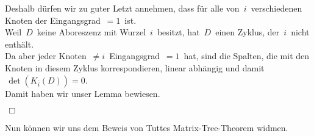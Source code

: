 Deshalb dürfen wir zu guter Letzt annehmen, dass für alle von $\,i\,$ verschiedenen Knoten der Eingangsgrad $\,=1\,$ ist.\\
Weil $\,D\,$ keine Aboreszenz mit Wurzel $\,i\,$ besitzt, hat $\,D\,$ einen Zyklus, der $\,i\,$ nicht enthält.\\
Da aber jeder Knoten $\,\neq i\,$ Eingangsgrad $\,=1\,$ hat, sind die Spalten, die mit den Knoten in diesem Zyklus korrespondieren, linear abhängig und damit $\,\det(K_{\bar{i}}(D)) = 0$.\; \\
Damit haben wir unser Lemma bewiesen.
\begin{flushright} $\,\Box\,$ \end{flushright} 

Nun können wir uns dem Beweis von Tuttes Matrix-Tree-Theorem widmen.

